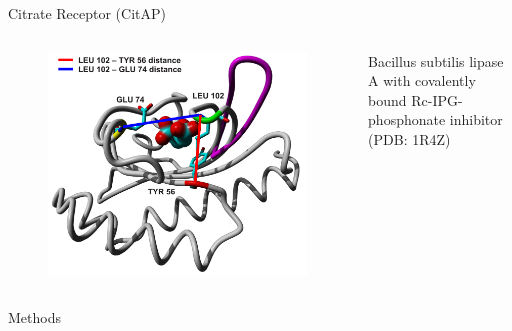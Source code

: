 \documentclass{beamer}
\begin{document}
\begin{frame}[t]
\begin{columns}[T,onlytextwidth]
\begin{column}[T]{.48\linewidth}
{\begin{block}{Citrate Receptor (CitAP)}
\begin{columns}[t]
                \begin{figure}
                    \includegraphics[width=.9\linewidth]{figures/CitA_pocket2.pdf}
                \end{figure}     
                \tiny Bacillus subtilis lipase A with covalently bound Rc-IPG-phosphonate inhibitor (PDB: 1R4Z)

            \end{columns}   

        \end{block}


        \vspace*{1.0ex}

        \vfill
        \begin{block}{Methods}


\end{block}}
\end{column}
\end{columns}
\end{frame}
\end{document}
